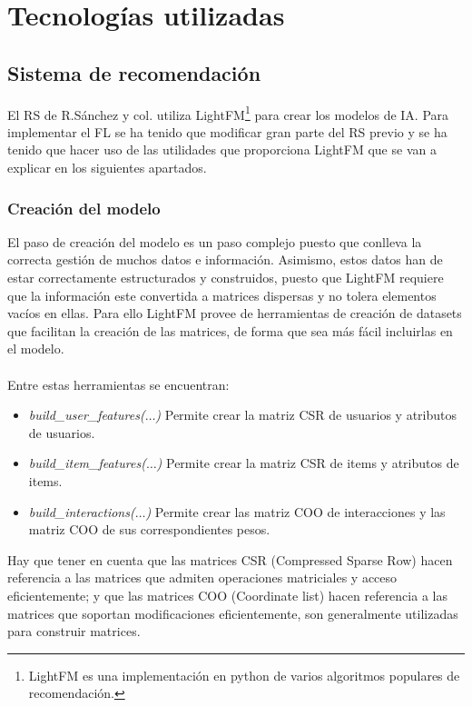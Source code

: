\section{Tecnologías utilizadas}

\subsection{Sistema de recomendación}
El RS de R.Sánchez y col. utiliza LightFM\footnote{LightFM es una implementación en python de varios algoritmos populares de recomendación.} para crear los modelos de IA. Para implementar el FL se ha tenido que modificar gran parte del RS previo y se ha tenido que hacer uso de las utilidades que proporciona LightFM que se van a explicar en los siguientes apartados. 
\subsubsection{Creación del modelo}
El paso de creación del modelo es un paso complejo puesto que conlleva la correcta gestión de muchos datos e información. Asimismo, estos datos han de estar correctamente estructurados y construidos, puesto que LightFM requiere que la información este convertida a matrices dispersas y no tolera elementos vacíos en ellas. Para ello LightFM provee de herramientas de creación de datasets que facilitan la creación de las matrices, de forma que sea más fácil incluirlas en el modelo. 
\\ \\
Entre estas herramientas se encuentran:

\begin{itemize}
    \item \textit{build\_user\_features($\ldots$)} \quad Permite crear la matriz CSR de usuarios y atributos de usuarios.
    \item \textit{build\_item\_features($\ldots$)} \quad Permite crear la matriz CSR  de items y atributos de items.
    \item \textit{build\_interactions($\ldots$)} \quad Permite crear las matriz COO de interacciones y las matriz COO de sus correspondientes pesos.
\end{itemize}

Hay que tener en cuenta que las matrices CSR (Compressed Sparse Row) hacen referencia a las matrices que admiten operaciones matriciales y acceso eficientemente; y que las matrices COO (Coordinate list) hacen referencia a las matrices que soportan modificaciones eficientemente, son generalmente utilizadas para construir matrices.


